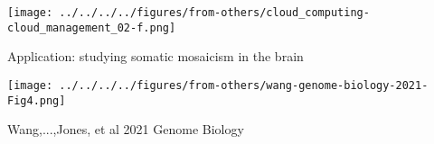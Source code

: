 \documentclass[aspectratio=169]{beamer}
\begin{document}
\begin{frame}[plain]
\begin{center}
\texttt{[image: ../../../../figures/from-others/cloud\_computing-cloud\_management\_02-f.png]}
\end{center}
\end{frame}


\begin{frame}{Application: studying somatic mosaicism in the brain}
\begin{center}
\texttt{[image: ../../../../figures/from-others/wang-genome-biology-2021-Fig4.png]}

{\tiny Wang,...,Jones, et al 2021 Genome Biology}
\end{center}
\end{frame}
\end{document}
